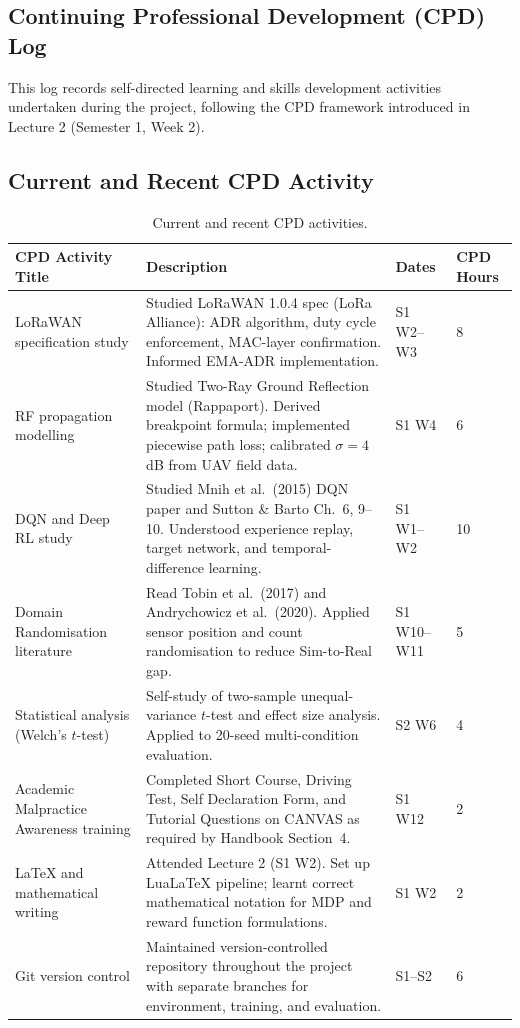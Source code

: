 \clearpage
\subsection{Continuing Professional Development (CPD) Log}
\label{app:cpd}

This log records self-directed learning and skills development activities undertaken during the project, following the CPD framework introduced in Lecture 2 (Semester 1, Week 2).

\subsection*{Current and Recent CPD Activity}

\begin{table}[H]
\centering
\caption{Current and recent CPD activities.}
\label{tab:cpd_current}
\small
\begin{tabularx}{\textwidth}{p{3.2cm} X p{2.0cm} p{1.5cm}}
\toprule
\textbf{CPD Activity Title} & \textbf{Description} & \textbf{Dates} & \textbf{CPD Hours} \\
\midrule
LoRaWAN specification study & Studied LoRaWAN 1.0.4 spec (LoRa Alliance): ADR algorithm, duty cycle enforcement, MAC-layer confirmation. Informed EMA-ADR implementation. & S1 W2--W3 & 8 \\
\midrule
RF propagation modelling & Studied Two-Ray Ground Reflection model (Rappaport). Derived breakpoint formula; implemented piecewise path loss; calibrated $\sigma=4$\,dB from UAV field data. & S1 W4 & 6 \\
\midrule
DQN and Deep RL study & Studied Mnih et al.\ (2015) DQN paper and Sutton \& Barto Ch.\ 6, 9--10. Understood experience replay, target network, and temporal-difference learning. & S1 W1--W2 & 10 \\
\midrule
Domain Randomisation literature & Read Tobin et al.\ (2017) and Andrychowicz et al.\ (2020). Applied sensor position and count randomisation to reduce Sim-to-Real gap. & S1 W10--W11 & 5 \\
\midrule
Statistical analysis (Welch's $t$-test) & Self-study of two-sample unequal-variance $t$-test and effect size analysis. Applied to 20-seed multi-condition evaluation. & S2 W6 & 4 \\
\midrule
Academic Malpractice Awareness training & Completed Short Course, Driving Test, Self Declaration Form, and Tutorial Questions on CANVAS as required by Handbook Section~4. & S1 W12 & 2 \\
\midrule
LaTeX and mathematical writing & Attended Lecture 2 (S1 W2). Set up LuaLaTeX pipeline; learnt correct mathematical notation for MDP and reward function formulations. & S1 W2 & 2 \\
\midrule
Git version control & Maintained version-controlled repository throughout the project with separate branches for environment, training, and evaluation. & S1--S2 & 6 \\
\bottomrule
\end{tabularx}
\end{table}


